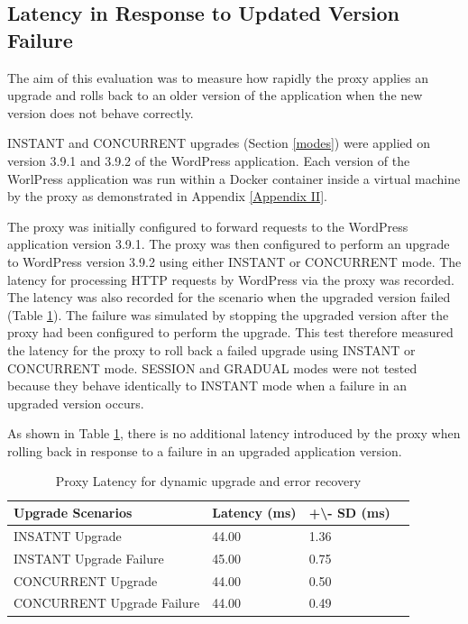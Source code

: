 \documentclass[a4paper,11pt,twoside]{report}
\begin{document}
\clearpage
\subsection{Latency in Response to Updated Version Failure}\label{Recovery}
The aim of this evaluation was to measure how rapidly the proxy applies an upgrade and rolls back to an older version of the application when the new version does not behave correctly. 

INSTANT and CONCURRENT upgrades (Section \ref{modes}) were applied on version 3.9.1 and 3.9.2 of the WordPress application. Each version of the WorlPress application was run within a Docker container inside a virtual machine by the proxy as demonstrated in Appendix \ref{Appendix II}.    

The proxy was initially configured to forward requests to the WordPress application version 3.9.1. The proxy was then configured to perform an upgrade to WordPress version 3.9.2 using either INSTANT or CONCURRENT mode. The latency for processing HTTP requests by WordPress via the proxy was recorded. The latency was also recorded for the scenario when the upgraded version failed (Table \ref{upgrade-speed}). The failure was simulated by stopping the upgraded version after the proxy had been configured to perform the upgrade. This test therefore measured the latency for the proxy to roll back a failed upgrade using INSTANT or CONCURRENT mode. SESSION and GRADUAL modes were not tested because they behave identically to INSTANT mode when a failure in an upgraded version occurs.

As shown in Table \ref{upgrade-speed}, there is no additional latency introduced by the proxy when rolling back in response to a failure in an upgraded application version. 

\begin{table}[!h]
\caption {Proxy Latency for dynamic upgrade and error recovery}
\label{upgrade-speed}
\begin{center}
    \begin{tabular}{ | l | l | l | p{5cm} |}
    \hline
   \textbf{Upgrade Scenarios} & \textbf{Latency (ms)} & \textbf{+\textbackslash }\textbf{- SD (ms)} \\ \hline
    INSATNT Upgrade & 44.00 &1.36 \\ \hline
    INSTANT Upgrade Failure & 45.00 & 0.75\\ \hline
    CONCURRENT Upgrade & 44.00 & 0.50\\ \hline
    CONCURRENT Upgrade Failure & 44.00 & 0.49\\
    \hline
    \end{tabular}
\end{center}
\end{table}
\end{document}
